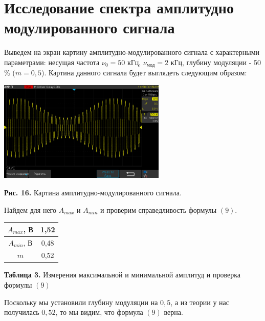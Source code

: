 \documentclass[a4paper, 12pt]{article}%
\begin{document}
\section*{Исследование спектра амплитудно модулированного сигнала}
Выведем на экран картину амплитудно-модулированного сигнала с характерными параметрами: несущая частота $\nu_0 = 50$ кГц, $\nu_{\text{мод}} = 2$ кГц, глубину модуляции - 50 \% ($m = 0,5$). Картина данного сигнала будет выглядеть следующим образом:
\begin{center}
\includegraphics[width = 0.6\textwidth]{AKIP0016.png}

\textbf{Рис. 16.} Картина амплитудно-модулированного сигнала.
\end{center}
Найдем для него $A_{max}$ и $A_{min}$ и проверим справедливость формулы $(9)$.
\begin{center}
\begin{tabular}{|c|c|}
\hline
$A_{max}$, В & 1,52 \\ \hline
$A_{min}$, В & 0,48 \\ \hline
$m$ & 0,52 \\ \hline
\end{tabular}

\textbf{Таблица 3.} Измерения максимальной и минимальной амплитуд и проверка формулы $(9)$
\end{center}
Поскольку мы установили глубину модуляции на $0,5$, а из теории у нас получилась $0,52$, то мы видим, что формула $(9)$ верна.
\end{document}
